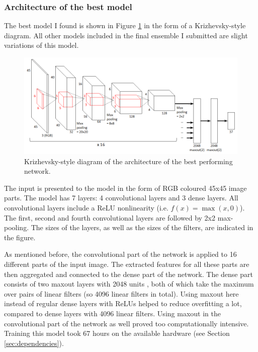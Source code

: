 \documentclass[a4paper,10pt]{article}
\begin{document}
\subsubsection{Architecture of the best model}

The best model I found is shown in Figure \ref{fig:architecture} in the form of a Krizhevsky-style diagram. All other models included in the final ensemble I submitted are slight variations of this model.

\begin{figure}
        \centering
	\includegraphics[width=1.0\textwidth]{architecture.png}
        \caption{Krizhevsky-style diagram of the architecture of the best performing network.}\label{fig:architecture}
\end{figure}

The input is presented to the model in the form of RGB coloured 45x45 image parts. The model has 7 layers: 4 convolutional layers and 3 dense layers. All convolutional layers include a ReLU nonlinearity (i.e. $f(x) = \max(x, 0)$). The first, second and fourth convolutional layers are followed by 2x2 max-pooling. The sizes of the layers, as well as the sizes of the filters, are indicated in the figure.

As mentioned before, the convolutional part of the network is applied to 16 different parts of the input image. The extracted features for all these parts are then aggregated and connected to the dense part of the network. The dense part consists of two maxout layers with 2048 units \cite{goodfellow2013maxout}, both of which take the maximum over pairs of linear filters (so 4096 linear filters in total). Using maxout here instead of regular dense layers with ReLUs helped to reduce overfitting a lot, compared to dense layers with 4096 linear filters. Using maxout in the convolutional part of the network as well proved too computationally intensive. Training this model took 67 hours on the available hardware (see Section \ref{sec:dependencies}).
\end{document}
